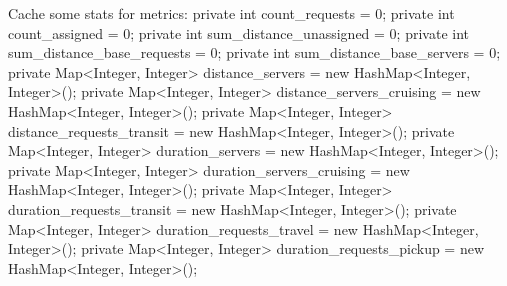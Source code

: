 Cache some stats for metrics:
\nwenddocs{}\plusendmoddef
private int count_requests = 0;
private int count_assigned = 0;
private int sum_distance_unassigned = 0;
private int sum_distance_base_requests = 0;
private int sum_distance_base_servers = 0;
private Map<Integer, Integer> distance_servers = new HashMap<Integer, Integer>();
private Map<Integer, Integer> distance_servers_cruising = new HashMap<Integer, Integer>();
private Map<Integer, Integer> distance_requests_transit = new HashMap<Integer, Integer>();
private Map<Integer, Integer> duration_servers = new HashMap<Integer, Integer>();
private Map<Integer, Integer> duration_servers_cruising = new HashMap<Integer, Integer>();
private Map<Integer, Integer> duration_requests_transit = new HashMap<Integer, Integer>();
private Map<Integer, Integer> duration_requests_travel = new HashMap<Integer, Integer>();
private Map<Integer, Integer> duration_requests_pickup = new HashMap<Integer, Integer>();
\nwendcode{}\nwdocspar

